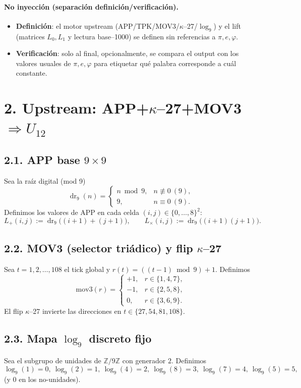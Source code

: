 \documentclass[11pt,a4paper]{article}
\theoremstyle{plain}
\theoremstyle{definition}
\theoremstyle{remark}
\begin{document}
\paragraph{No inyecci\'on (separaci\'on definici\'on/verificaci\'on).}
\begin{itemize}
\item \textbf{Definici\'on}: el motor upstream (APP/TPK/MOV3/$\kappa$--27/$\log_9$) y el lift (matrices $L_0,L_1$ y lectura base--1000) se definen sin referencias a $\pi,e,\varphi$.
\item \textbf{Verificaci\'on}: solo al final, opcionalmente, se compara el output con los valores usuales de $\pi,e,\varphi$ para etiquetar qu\'e palabra corresponde a cu\'al constante.
\end{itemize}

\section*{2. Upstream: APP+$\kappa$--27+MOV3 $\Rightarrow U_{12}$}

\subsection*{2.1. APP base $9\times 9$}
Sea la ra\'iz digital (mod 9)
\[
\operatorname{dr}_9(n)=\begin{cases}n\bmod 9,&n\not\equiv 0\ (9),\\ 9,&n\equiv 0\ (9).\end{cases}
\]
Definimos los valores de APP en cada celda $(i,j)\in\{0,\dots,8\}^2$:
\[
L_+(i,j):=\operatorname{dr}_9\big((i+1)+(j+1)\big),\qquad
L_{\times}(i,j):=\operatorname{dr}_9\big((i+1)(j+1)\big).
\]

\subsection*{2.2. MOV3 (selector tri\'adico) y flip $\kappa$--27}
Sea $t=1,2,\dots,108$ el tick global y $r(t)=((t-1)\bmod 9)+1$.
Definimos
\[
\mathrm{mov3}(r)=
\begin{cases}
+1,&r\in\{1,4,7\},\\
-1,&r\in\{2,5,8\},\\
0,&r\in\{3,6,9\}.
\end{cases}
\]
El flip $\kappa$--27 invierte las direcciones en $t\in\{27,54,81,108\}$.

\subsection*{2.3. Mapa $\log_9$ discreto fijo}
Sea el subgrupo de unidades de $\mathbb Z/9\mathbb Z$ con generador $2$.
Definimos
\[
\log_9(1)=0,\ \log_9(2)=1,\ \log_9(4)=2,\ \log_9(8)=3,\ \log_9(7)=4,\ \log_9(5)=5,
\]
(y $0$ en los no-unidades).
\end{document}
